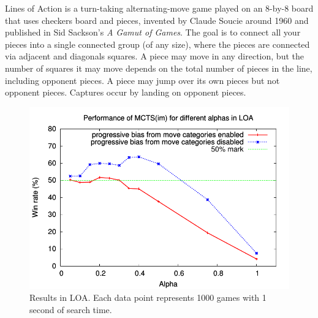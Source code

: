 \documentclass[letterpaper]{article}
\begin{document}
Lines of Action is a turn-taking alternating-move game played on an 8-by-8 board that uses checkers board and pieces, 
invented by Claude Soucie around 1960 and published in Sid Sackson's {\it A Gamut of Games}. 
The goal is to connect all your pieces into a single connected group (of any size), 
where the pieces are connected via adjacent and diagonals squares. A piece may move in any direction, but the number of squares 
it may move depends on the total number of pieces in the line, including opponent pieces. A piece may jump over its own
pieces but not opponent pieces. Captures occur by landing on opponent pieces. 

\begin{figure}
\begin{center}
\includegraphics[scale=0.7]{plots/loa-alpha}
\caption{Results in LOA. Each data point represents 1000 games with 1 second of search time.} 
\label{fig:loa-alpha}
\end{center}
\end{figure}



\end{document}
